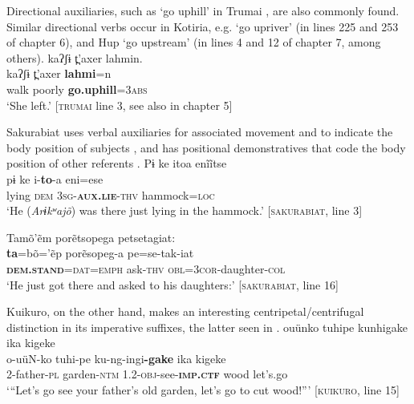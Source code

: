\documentclass[output=paper,
modfonts,nonflat
]{langsci/langscibook}
\begin{document}
Directional auxiliaries, such as ‘go uphill’ in Trumai , are also commonly found. Similar directional verbs occur in Kotiria, e.g. ‘go upriver’ (in lines 225 and 253 of chapter 6),  and Hup ‘go upstream’ (in lines 4 and 12 of chapter 7, among others).
\ea\label{ex:intro:28} kaʔʃɨ  t̪'axer lahmin.\\[.3em]
\gll kaʔʃɨ    t̪'axer   \textbf{lahmi}=n\\
walk    poorly  \textbf{go.uphill}=\textsc{3abs}\\
\glt ‘She left.' [\textsc{trumai} line 3, see also  in chapter 5]
\z

Sakurabiat uses verbal auxiliaries for associated movement and to indicate the body position of subjects , and has positional demonstratives that code the body position of other referents .
\ea\label{ex:intro:29} Pɨ ke itoa enĩĩtse\\[.3em]
\gll pɨ ke i-\textbf{to}-a eni=ese\\
     lying \textsc{dem} \textsc{3sg-\textbf{aux.lie}-thv} hammock=\textsc{loc}\\
\glt ‘He (\textit{Arɨkʷajõ}) was there just lying in the hammock.’ [\textsc{sakurabiat}, line 3]
\z 

\ea\label{ex:intro:30} Tamõ'ẽm porẽtsopega petsetagiat:\\[.3em]
\gll \textbf{ta}=bõ='ẽp porẽsopeg-a pe=se-tak-iat\\
     \textbf{\textsc{dem.stand}}=\textsc{dat}=\textsc{emph} ask-\textsc{thv} \textsc{obl}=\textsc{3cor}-daughter-\textsc{col}\\
\glt ‘He just got there and asked to his daughters:’ [\textsc{sakurabiat}, line 16]
\z

Kuikuro, on the other hand, makes an interesting centripetal/centrifugal distinction in its imperative suffixes, the latter seen in . 
\ea\label{ex:intro:31} ouünko tuhipe kunhigake ika kigeke \\[.3em]
\gll o-uüN-ko	tuhi-pe		     ku-ng-ingi\textbf{-gake}	ika	kigeke	\\
2-father-\textsc{pl} 	garden-\textsc{ntm} 	     1.2-\textsc{obj}-see-\textbf{\textsc{imp.ctf}} 		wood 	let’s.go\\
\glt ‘“Let’s go see your father’s old garden, let’s go to cut wood!”’ [\textsc{kuikuro}, line 15]\\
\z 
\end{document}

